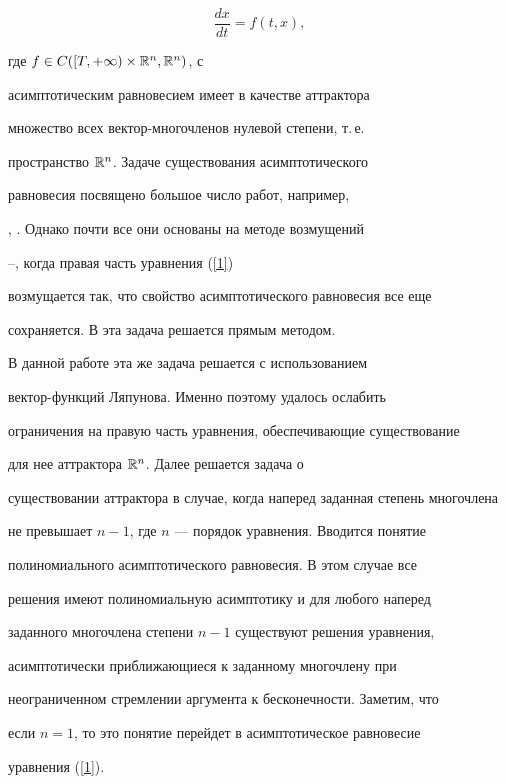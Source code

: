 \begin{equation}


\label{1}


\frac{dx}{dt}=f(t,x),


\end{equation}


где $f\in C([T,+\infty)\times {\Bbb R}^{n},{\Bbb R}^{n})$, с


асимптотическим равновесием \cite{5} имеет в качестве аттрактора


множество всех вектор-многочленов нулевой степени, т.\,е.


пространство ${\Bbb R}^n$. Задаче существования асимптотического


равновесия посвящено большое число работ, например,


\cite{6}, \cite{7}. Однако почти все они основаны на методе возмущений


\cite{5}--\cite{7}, когда правая часть уравнения (\ref{1})


возмущается так, что свойство асимптотического равновесия все еще


сохраняется. В \cite{8} эта задача решается прямым методом.


В данной работе эта же задача решается с использованием


вектор-функций Ляпунова. Именно поэтому удалось ослабить


ограничения на правую часть уравнения, обеспечивающие существование


для нее аттрактора ${\Bbb R}^n$. Далее решается задача о


существовании аттрактора в случае, когда наперед заданная степень многочлена


не превышает $n-1$, где $n$ --- порядок уравнения. Вводится понятие


полиномиального асимптотического равновесия. В этом случае все


решения имеют полиномиальную асимптотику и для любого наперед


заданного многочлена степени $n-1$ существуют решения уравнения,


асимптотически приближающиеся к заданному многочлену при


неограниченном стремлении аргумента к бесконечности. Заметим, что


если $n=1$, то это понятие перейдет в асимптотическое равновесие


уравнения (\ref{1}).





